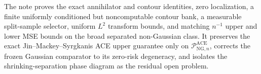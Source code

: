 The note proves the exact annihilator and contour identities, zero localization, a finite uniformly conditioned but noncomputable contour bank, a measurable split-sample selector, uniform \(L^2\) transform bounds, and matching \(n^{-1}\) upper and lower MSE bounds on the broad separated non-Gaussian class.  It preserves the exact Jin--Mackey--Syrgkanis ACE upper guarantee only on \(\mathcal P_{\mathrm{NG},n}^{\mathrm{ACE}}\), corrects the frozen Gaussian comparator to its zero-risk degeneracy, and isolates the shrinking-separation phase diagram as the residual open problem.